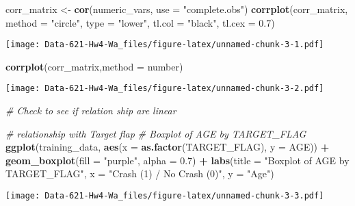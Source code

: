 \documentclass[
]{article}
\newenvironment{Shaded}{\begin{snugshade}}{\end{snugshade}}
\newcommand{\AttributeTok}[1]{\textcolor[rgb]{0.13,0.29,0.53}{#1}}
\newcommand{\CommentTok}[1]{\textcolor[rgb]{0.56,0.35,0.01}{\textit{#1}}}
\newcommand{\FloatTok}[1]{\textcolor[rgb]{0.00,0.00,0.81}{#1}}
\newcommand{\FunctionTok}[1]{\textcolor[rgb]{0.13,0.29,0.53}{\textbf{#1}}}
\newcommand{\NormalTok}[1]{#1}
\newcommand{\OtherTok}[1]{\textcolor[rgb]{0.56,0.35,0.01}{#1}}
\newcommand{\SpecialCharTok}[1]{\textcolor[rgb]{0.81,0.36,0.00}{\textbf{#1}}}
\newcommand{\StringTok}[1]{\textcolor[rgb]{0.31,0.60,0.02}{#1}}
\begin{document}
\begin{Shaded}
\begin{Highlighting}[]
\NormalTok{corr\_matrix }\OtherTok{\textless{}{-}} \FunctionTok{cor}\NormalTok{(numeric\_vars, }\AttributeTok{use =} \StringTok{"complete.obs"}\NormalTok{)}
\FunctionTok{corrplot}\NormalTok{(corr\_matrix, }\AttributeTok{method =} \StringTok{"circle"}\NormalTok{, }\AttributeTok{type =} \StringTok{"lower"}\NormalTok{, }\AttributeTok{tl.col =} \StringTok{"black"}\NormalTok{, }\AttributeTok{tl.cex =} \FloatTok{0.7}\NormalTok{)}
\end{Highlighting}
\end{Shaded}

\texttt{[image: Data-621-Hw4-Wa\_files/figure-latex/unnamed-chunk-3-1.pdf]}

\begin{Shaded}
\begin{Highlighting}[]
\FunctionTok{corrplot}\NormalTok{(corr\_matrix,}\AttributeTok{method =} \StringTok{\textquotesingle{}number\textquotesingle{}}\NormalTok{)}
\end{Highlighting}
\end{Shaded}

\texttt{[image: Data-621-Hw4-Wa\_files/figure-latex/unnamed-chunk-3-2.pdf]}

\begin{Shaded}
\begin{Highlighting}[]
\CommentTok{\#  Check to see if relation ship are linear }


\CommentTok{\# relationship with Target flap}
\CommentTok{\# Boxplot of AGE by TARGET\_FLAG}
\FunctionTok{ggplot}\NormalTok{(training\_data, }\FunctionTok{aes}\NormalTok{(}\AttributeTok{x =} \FunctionTok{as.factor}\NormalTok{(TARGET\_FLAG), }\AttributeTok{y =}\NormalTok{ AGE)) }\SpecialCharTok{+}
  \FunctionTok{geom\_boxplot}\NormalTok{(}\AttributeTok{fill =} \StringTok{"purple"}\NormalTok{, }\AttributeTok{alpha =} \FloatTok{0.7}\NormalTok{) }\SpecialCharTok{+}
  \FunctionTok{labs}\NormalTok{(}\AttributeTok{title =} \StringTok{"Boxplot of AGE by TARGET\_FLAG"}\NormalTok{, }\AttributeTok{x =} \StringTok{"Crash (1) / No Crash (0)"}\NormalTok{, }\AttributeTok{y =} \StringTok{"Age"}\NormalTok{)}
\end{Highlighting}
\end{Shaded}

\texttt{[image: Data-621-Hw4-Wa\_files/figure-latex/unnamed-chunk-3-3.pdf]}
\end{document}
